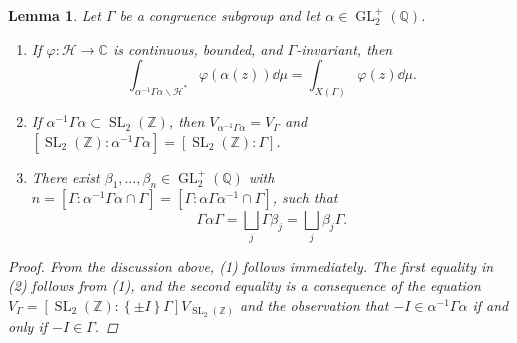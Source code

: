 \documentclass[10pt,leqno,twoside]{article}
\theoremstyle{plain}
\newtheorem{lemma}[lem]{Lemma}
\theoremstyle{definition}
\numberwithin{equation}{section}
\numberwithin{lem}{section}
\newcommand{\cbr}[1]{\left\{#1\right\}}
\DeclareMathOperator{\GL}{GL}
\DeclareMathOperator{\SL}{SL}
\newcommand{\slz}{\SL_2(\mathbb{Z})}
\newcommand{\glqp}{\GL_2^+(\mathbb{Q})}
\begin{document}
\begin{lemma}\label{lem: properties of integral over fund.domain and glqp}
    Let $\varGamma$ be a congruence subgroup and let $\alpha\in\glqp$.\begin{enumerate}[label = \textup{(\arabic*)}]
        \item If $\varphi\colon\mathcal H\to\mathbb C$ is continuous, bounded, and $\varGamma$-invariant, then \[\int_{\alpha^{-1}\varGamma\alpha\backslash \mathcal H^\ast}\varphi(\alpha(z))\dd\mu = \int_{X(\varGamma)}\varphi(z)\dd\mu.\]
        \item If $\alpha^{-1}\varGamma\alpha\subset \slz$, then $V_{\alpha^{-1}\varGamma\alpha} = V_\varGamma$ and $[\slz : \alpha^{-1}\varGamma\alpha] = [\slz : \varGamma]$.
        \item There exist $\beta_1,\dots,\beta_n\in \glqp$ with $n=[\varGamma : \alpha^{-1}\varGamma\alpha\cap\varGamma] = [\varGamma : \alpha\varGamma\alpha^{-1}\cap \varGamma]$, such that \[\varGamma\alpha\varGamma = \bigsqcup_j\varGamma \beta_j = \bigsqcup_j\beta_j\varGamma.\]
    \end{enumerate}
    \begin{proof}
        From the discussion above, (1) follows immediately. The first equality in (2) follows from (1), and the second equality is a consequence of the equation $V_\varGamma = [\slz : \cbr{\pm I}\varGamma]V_{\slz}$ and the observation that $-I\in\alpha^{-1}\varGamma\alpha$ if and only if $-I\in\varGamma$.


\end{proof}
\end{lemma}
\end{document}
